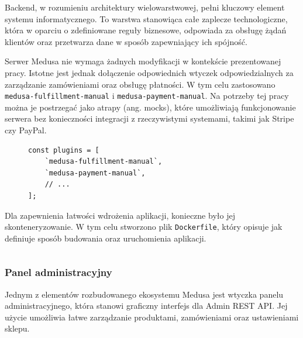 
Backend, w rozumieniu architektury wielowarstwowej, pełni kluczowy element systemu informatycznego.
To warstwa stanowiąca całe zaplecze technologiczne, która w oparciu o zdefiniowane reguły biznesowe, odpowiada za obsługę żądań klientów oraz przetwarza dane w sposób zapewniający ich spójność.


Serwer Medusa nie wymaga żadnych modyfikacji w kontekście prezentowanej pracy.
Istotne jest jednak dołączenie odpowiednich wtyczek odpowiedzialnych za zarządzanie zamówieniami oraz obsługę płatności.
W tym celu zastosowano \texttt{medusa-fulfillment-manual}  i \texttt{medusa-payment-manual}.
Na potrzeby tej pracy można je postrzegać jako atrapy (ang. mocks), które umożliwiają funkcjonowanie serwera bez konieczności integracji z rzeczywistymi systemami, takimi jak Stripe czy PayPal.

\begin{figure}[H]
    \begin{verbatim}
const plugins = [
    `medusa-fulfillment-manual`,
    `medusa-payment-manual`,
    // ...
];
    \end{verbatim}
    \label{fig:medusa-config-fulfillment-payment}
\end{figure}

Dla zapewnienia łatwości wdrożenia aplikacji, konieczne było jej skonteneryzowanie.
W tym celu stworzono plik \texttt{Dockerfile}, który opisuje jak definiuje sposób budowania oraz uruchomienia aplikacji.

\begin{figure}[H]
    \inputminted{docker}{code/Dockerfile.backend}
\end{figure}

\subsubsection{Panel administracyjny}


Jednym z elementów rozbudowanego ekosystemu Medusa jest wtyczka panelu administracyjnego, która stanowi graficzny interfejs dla Admin REST API.
Jej użycie umożliwia łatwe zarządzanie produktami, zamówieniami oraz ustawieniami sklepu.

